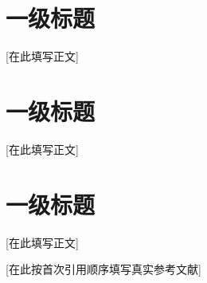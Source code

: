 \documentclass[UTF8,fontset=none,scheme=plain,zihao=-4]{ctexart}
\begin{document}

\section{一级标题}
[在此填写正文]
\section{一级标题}
[在此填写正文]
\section{一级标题}
[在此填写正文]

\begin{thesisreferences}
 [在此按首次引用顺序填写真实参考文献]
\end{thesisreferences}

\begin{thesisacknowledgements}
[在此填写致谢]
\end{thesisacknowledgements}
\end{document}
